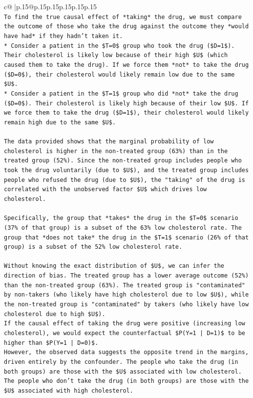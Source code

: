 \documentclass{article}
\begin{document}
{\begin{supertabular}{c@{$\;$}|p{.15\linewidth}@{}p{.15\linewidth}p{.15\linewidth}p{.15\linewidth}p{.15\linewidth}p{.15\linewidth}}
{{{\\ 
\texttt{To find the true causal effect of *taking* the drug, we must compare the outcome of those who take the drug against the outcome they *would have had* if they hadn't taken it.} \\
\texttt{*   Consider a patient in the \$T=0\$ group who took the drug (\$D=1\$). Their cholesterol is likely low because of their high \$U\$ (which caused them to take the drug). If we force them *not* to take the drug (\$D=0\$), their cholesterol would likely remain low due to the same \$U\$.} \\
\texttt{*   Consider a patient in the \$T=1\$ group who did *not* take the drug (\$D=0\$). Their cholesterol is likely high because of their low \$U\$. If we force them to take the drug (\$D=1\$), their cholesterol would likely remain high due to the same \$U\$.} \\
\\ 
\texttt{The data provided shows that the marginal probability of low cholesterol is higher in the non{-}treated group (63\%) than in the treated group (52\%). Since the non{-}treated group includes people who took the drug voluntarily (due to \$U\$), and the treated group includes people who refused the drug (due to \$U\$), the "taking" of the drug is correlated with the unobserved factor \$U\$ which drives low cholesterol.} \\
\\ 
\texttt{Specifically, the group that *takes* the drug in the \$T=0\$ scenario (37\% of that group) is a subset of the 63\% low cholesterol rate. The group that *does not take* the drug in the \$T=1\$ scenario (26\% of that group) is a subset of the 52\% low cholesterol rate.} \\
\\ 
\texttt{Without knowing the exact distribution of \$U\$, we can infer the direction of bias. The treated group has a lower average outcome (52\%) than the non{-}treated group (63\%). The treated group is "contaminated" by non{-}takers (who likely have high cholesterol due to low \$U\$), while the non{-}treated group is "contaminated" by takers (who likely have low cholesterol due to high \$U\$).} \\
\texttt{If the causal effect of taking the drug were positive (increasing low cholesterol), we would expect the counterfactual \$P(Y=1 | D=1)\$ to be higher than \$P(Y=1 | D=0)\$.} \\
\texttt{However, the observed data suggests the opposite trend in the margins, driven entirely by the confounder. The people who take the drug (in both groups) are those with the \$U\$ associated with low cholesterol. The people who don't take the drug (in both groups) are those with the \$U\$ associated with high cholesterol.} \\
}}}
\end{supertabular}}
\end{document}
